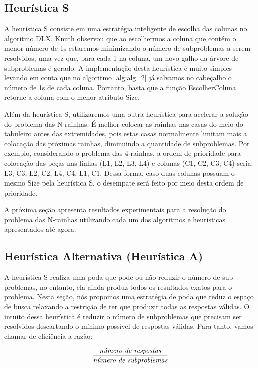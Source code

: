 \documentclass{article}
\begin{document}
\subsection{Heurística S}

A heurística S consiste em uma estratégia inteligente de escolha das colunas no algoritmo DLX. Knuth
observou que ao escolhermos a coluna que contém o menor número de 1s estaremos minimizando o
número de subproblemas a serem resolvidos, uma vez que, para cada 1 na coluna, um novo galho da árvore de subproblemas é gerado.
A implementação desta heurística é muito simples levando em conta que no algoritmo \ref{alg:alg_2} já salvamos no 
cabeçalho o número de 1s de cada coluna. Portanto, basta que a função EscolherColuna retorne a coluna com o menor
atributo Size.

Além da heurística S, utilizaremos uma outra heurística para acelerar a solução do problema das N-rainhas.
É melhor colocar as rainhas nas casas do meio do tabuleiro antes das extremidades, pois estas casas
normalmente limitam mais a colocação das próximas rainhas, diminuindo a quantidade de subproblemas.
Por exemplo, considerando o problema das 4 rainhas, a ordem de prioridade para colocação das peças nas 
linhas (L1, L2, L3, L4) e colunas (C1, C2, C3, C4) seria: L3, C3, L2, C2, L4, C4, L1, C1. Dessa forma,
caso duas colunas possuam o mesmo Size pela heurística S, o desempate será feito por meio desta ordem de prioridade.

A próxima seção apresenta resultados experimentais para a resolução do problema das N-rainhas utilizando cada um dos algoritmos
e heurísticas apresentados até agora.

\subsection{Heurística Alternativa (Heurística A)}

A heurística S realiza uma poda que pode ou não reduzir o número de sub problemas, no entanto, ela ainda produz 
todos os resultados exatos para o problema. 
Nesta seção, nós propomos uma estratégia de poda que reduz o espaço de busca relaxando a restrição 
de ter que produzir todas as respostas válidas. O intuito dessa heurística é reduzir o número de subproblemas
que precisam ser resolvidos descartando o mínimo possível de respostas válidas. Para tanto, vamos chamar de eficiência a razão:

\begin{equation}
\centering
\frac{\textit{número de respostas}}{\textit{número de subproblemas}}
\end{equation}
\end{document}

